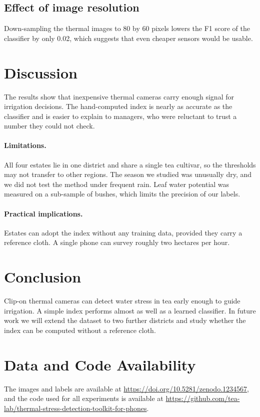\documentclass[10pt,twocolumn]{article}
\begin{document}
\subsection{Effect of image resolution}
Down-sampling the thermal images to 80 by 60 pixels lowers the F1 score of the classifier by only 0.02, which suggests that even cheaper sensors would be usable.

\section{Discussion}
The results show that inexpensive thermal cameras carry enough signal for irrigation decisions. The hand-computed index is nearly as accurate as the classifier and is easier to explain to managers, who were reluctant to trust a number they could not check.

\paragraph{Limitations.} All four estates lie in one district and share a single tea cultivar, so the thresholds may not transfer to other regions. The season we studied was unusually dry, and we did not test the method under frequent rain. Leaf water potential was measured on a sub-sample of bushes, which limits the precision of our labels.

\paragraph{Practical implications.} Estates can adopt the index without any training data, provided they carry a reference cloth. A single phone can survey roughly two hectares per hour.

\section{Conclusion}
Clip-on thermal cameras can detect water stress in tea early enough to guide irrigation. A simple index performs almost as well as a learned classifier. In future work we will extend the dataset to two further districts and study whether the index can be computed without a reference cloth.

\section*{Data and Code Availability}
The images and labels are available at \url{https://doi.org/10.5281/zenodo.1234567}, and the code used for all experiments is available at \url{https://github.com/tea-lab/thermal-stress-detection-toolkit-for-phones}.
\end{document}
